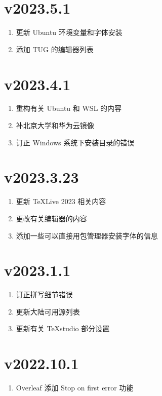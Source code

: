 \section*{v2023.5.1}

\begin{enumerate}
  \item 更新 Ubuntu 环境变量和字体安装
  \item 添加 TUG 的编辑器列表
\end{enumerate}

\section*{v2023.4.1}

\begin{enumerate}
  \item 重构有关 Ubuntu 和 WSL 的内容
  \item 补北京大学和华为云镜像
  \item 订正 Windows 系统下安装目录的错误
\end{enumerate}

\section*{v2023.3.23}

\begin{enumerate}
  \item 更新 \TeX Live 2023 相关内容
  \item 更改有关编辑器的内容
  \item 添加一些可以直接用包管理器安装字体的信息
\end{enumerate}

\section*{v2023.1.1}

\begin{enumerate}
  \item 订正拼写细节错误
  \item 更新大陆可用源列表
  \item 更新有关 \TeX studio 部分设置
\end{enumerate}

\section*{v2022.10.1}

\begin{enumerate}
  \item Overleaf 添加 Stop on first error 功能
\end{enumerate}

